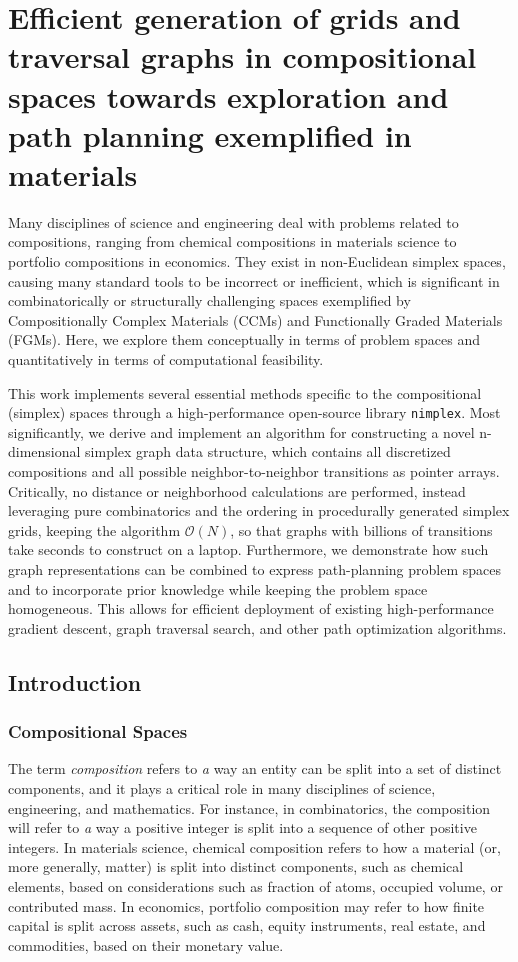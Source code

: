\chapter{Efficient generation of grids and traversal graphs in compositional spaces towards exploration and path planning exemplified in materials}


Many disciplines of science and engineering deal with problems related to compositions, ranging from chemical compositions in materials science to portfolio compositions in economics. They exist in non-Euclidean simplex spaces, causing many standard tools to be incorrect or inefficient, which is significant in combinatorically or structurally challenging spaces exemplified by Compositionally Complex Materials (CCMs) and Functionally Graded Materials (FGMs). Here, we explore them conceptually in terms of problem spaces and quantitatively in terms of computational feasibility.

This work implements several essential methods specific to the compositional (simplex) spaces through a high-performance open-source library \texttt{nimplex}. Most significantly, we derive and implement an algorithm for constructing a novel n-dimensional simplex graph data structure, which contains all discretized compositions and all possible neighbor-to-neighbor transitions as pointer arrays. Critically, no distance or neighborhood calculations are performed, instead leveraging pure combinatorics and the ordering in procedurally generated simplex grids, keeping the algorithm $\mathcal{O}(N)$, so that graphs with billions of transitions take seconds to construct on a laptop. Furthermore, we demonstrate how such graph representations can be combined to express path-planning problem spaces and to incorporate prior knowledge while keeping the problem space homogeneous. This allows for efficient deployment of existing high-performance gradient descent, graph traversal search, and other path optimization algorithms.

\section{Introduction} \label{sec:introduction}

\subsection{Compositional Spaces} \label{ssec:compositionalspaces}

The term \emph{composition} refers to \emph{a} way an entity can be split into a set of distinct components, and it plays a critical role in many disciplines of science, engineering, and mathematics. For instance, in combinatorics, the composition will refer to \emph{a} way a positive integer is split into a sequence of other positive integers. In materials science, chemical composition refers to how a material (or, more generally, matter) is split into distinct components, such as chemical elements, based on considerations such as fraction of atoms, occupied volume, or contributed mass. In economics, portfolio composition may refer to how finite capital is split across assets, such as cash, equity instruments, real estate, and commodities, based on their monetary value.

